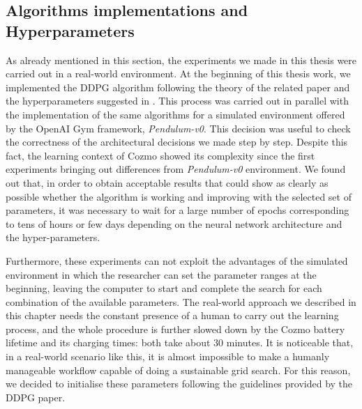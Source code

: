 \subsection{Algorithms implementations and Hyperparameters}

As already mentioned in this section, the experiments we made in this thesis were carried out in a real-world environment.
At the beginning of this thesis work, we implemented the DDPG algorithm following the theory of the related paper and the hyperparameters suggested in \cite{lillicrap2015continuous,kendall2018learning,kendall2019learning}.
This process was carried out in parallel with the implementation of the same algorithms for a simulated environment offered by the OpenAI Gym framework, \textit{Pendulum-v0}.
This decision was useful to check the correctness of the architectural decisions we made step by step.
Despite this fact, the learning context of Cozmo showed its complexity since the first experiments bringing out differences from \textit{Pendulum-v0} environment.
We found out that, in order to obtain acceptable results that could show as clearly as possible whether the algorithm is working and improving with the selected set of parameters, it was necessary to wait for a large number of epochs corresponding to tens of hours or few days depending on the neural network architecture and the hyper-parameters.

Furthermore, these experiments can not exploit the advantages of the simulated environment in which the researcher can set the parameter ranges at the beginning, leaving the computer to start and complete the search for each combination of the available parameters.
The real-world approach we described in this chapter needs the constant presence of a human to carry out the learning process, and the whole procedure is further slowed down by the Cozmo battery lifetime and its charging times: both take about 30 minutes.
It is noticeable that, in a real-world scenario like this, it is almost impossible to make a humanly manageable workflow capable of doing a sustainable grid search.
For this reason, we decided to initialise these parameters following the guidelines provided by the DDPG paper.

